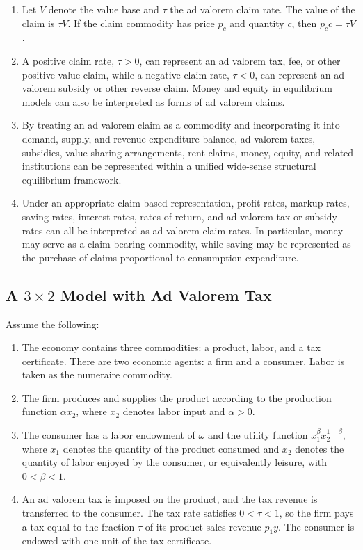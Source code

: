 \documentclass[
  letterpaper,
  DIV=11,
  numbers=noendperiod]{scrreprt}
\begin{document}
\begin{enumerate}
\def\labelenumi{\arabic{enumi}.}
\item
  Let \(V\) denote the value base and \(\tau\) the ad valorem claim
  rate. The value of the claim is \(\tau V\). If the claim commodity has
  price \(p_c\) and quantity \(c\), then \(p_c c=\tau V\).
\item
  A positive claim rate, \(\tau>0\), can represent an ad valorem tax,
  fee, or other positive value claim, while a negative claim rate,
  \(\tau<0\), can represent an ad valorem subsidy or other reverse
  claim. Money and equity in equilibrium models can also be interpreted
  as forms of ad valorem claims.
\item
  By treating an ad valorem claim as a commodity and incorporating it
  into demand, supply, and revenue-expenditure balance, ad valorem
  taxes, subsidies, value-sharing arrangements, rent claims, money,
  equity, and related institutions can be represented within a unified
  wide-sense structural equilibrium framework.
\item
  Under an appropriate claim-based representation, profit rates, markup
  rates, saving rates, interest rates, rates of return, and ad valorem
  tax or subsidy rates can all be interpreted as ad valorem claim rates.
  In particular, money may serve as a claim-bearing commodity, while
  saving may be represented as the purchase of claims proportional to
  consumption expenditure.
\end{enumerate}

\subsection{\texorpdfstring{A \(3\times2\) Model with Ad Valorem
Tax}{A 3\textbackslash times2 Model with Ad Valorem Tax}}\label{a-3times2-model-with-ad-valorem-tax}

Assume the following:

\begin{enumerate}
\def\labelenumi{\arabic{enumi}.}
\item
  The economy contains three commodities: a product, labor, and a tax
  certificate. There are two economic agents: a firm and a consumer.
  Labor is taken as the numeraire commodity.
\item
  The firm produces and supplies the product according to the production
  function \(\alpha x_2\), where \(x_2\) denotes labor input and
  \(\alpha>0\).
\item
  The consumer has a labor endowment of \(\omega\) and the utility
  function \(x_1^\beta x_2^{1-\beta}\), where \(x_1\) denotes the
  quantity of the product consumed and \(x_2\) denotes the quantity of
  labor enjoyed by the consumer, or equivalently leisure, with
  \(0<\beta<1\).
\item
  An ad valorem tax is imposed on the product, and the tax revenue is
  transferred to the consumer. The tax rate satisfies \(0<\tau<1\), so
  the firm pays a tax equal to the fraction \(\tau\) of its product
  sales revenue \(p_1y\). The consumer is endowed with one unit of the
  tax certificate.
\end{enumerate}
\end{document}
